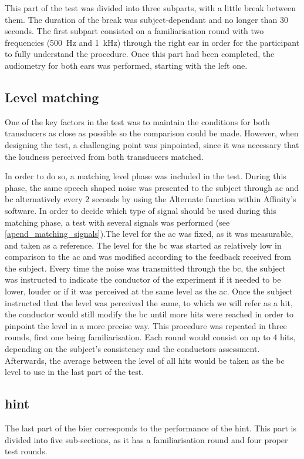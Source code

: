 This part of the test was divided into three subparts, with a little break between them. The duration of the break was subject-dependant and no longer than 30 seconds.
The first subpart consisted on a familiarisation round with two frequencies (\SI{500}{\hertz} and \SI{1}{\kilo\hertz}) through the right ear in order for the participant to fully understand the procedure. Once this part had been completed, the audiometry for both ears was performed, starting with the left one.

\subsection{Level matching}
One of the key factors in the test was to maintain the conditions for both transducers as close as possible so the comparison could be made. However, when designing the test, a challenging point was pinpointed, since it was necessary that the loudness perceived from both transducers matched.

In order to do so, a matching level phase was included in the test. During this phase, the same speech shaped noise was presented to the subject through \gls{ac} and \gls{bc} alternatively every 2 seconds by using the Alternate function within Affinity's software. In order to decide which type of signal should be used during this matching phase, a test with several signals was performed (see \autoref{apend_matching_signals}).The level for the \gls{ac} was fixed, as it was measurable, and taken as a reference. The level for the \gls{bc} was started as relatively low in comparison to the \gls{ac} and was modified according to the feedback received from the subject. Every time the noise was transmitted through the \gls{bc}, the subject was instructed to indicate the conductor of the experiment if it needed to be lower, louder or if it was perceived at the same level as the \gls{ac}. Once the subject instructed that the level was perceived the same, to which we will refer as a hit, the conductor would still modify the \gls{bc} until more hits were reached in order to pinpoint the level in a more precise way.
This procedure was repeated in three rounds, first one being familiarisation. Each round would consist on up to 4 hits, depending on the subject's consistency and the conductors assessment. Afterwards, the average between the level of all hits would be taken as the \gls{bc} level to use in the last part of the test.


\subsection{\gls{hint}}
The last part of the \gls{bier} corresponds to the performance of the \gls{hint}. This part is divided into five sub-sections, as it has a familiarisation round and four proper test rounds.

